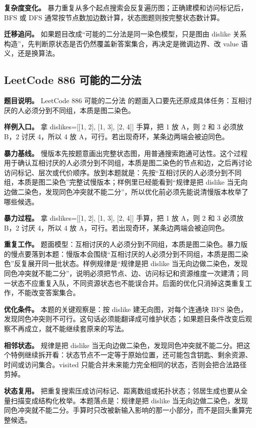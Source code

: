 \textbf{复杂度变化。} 暴力重复从多个起点搜索会反复遍历图；正确建模和访问标记后，BFS 或 DFS 通常按节点数加边数计算，状态图题则按完整状态数计算。

\textbf{迁移追问。} 如果题目改成“可能的二分法是同一染色模型，只是图由 dislike 关系构造”，先判断原状态是否仍然覆盖新答案集合，再决定是微调边界、改 value 语义，还是换算法。

\subsection{LeetCode 886 可能的二分法}

\textbf{题目说明。} LeetCode 886 可能的二分法 的题面入口要先还原成具体任务：互相讨厌的人必须分到不同组，本质是图二染色。

\textbf{样例入口。} 拿 dislikes=[[1, 2], [1, 3], [2, 4]] 手算，把 1 放 A，则 2 和 3 必须放 B，2 讨厌 4，所以 4 放 A，可行。若出现奇环，某条边两端会被迫同色。

\textbf{暴力基线。} 慢版本先按题意画出完整状态图，用普通搜索跑通可达性。这个过程用于确认互相讨厌的人必须分到不同组，本质是图二染色的节点和边，之后再讨论访问标记、层次或代价顺序。放到本题就是：先按“互相讨厌的人必须分到不同组，本质是图二染色”完整试慢版本；样例里已经能看到“规律是把 dislike 当无向边做二染色，发现同色冲突就不能二分”，所以优化前必须先能说清慢版本枚举了哪些候选。

\textbf{暴力过程。} 拿 dislikes=[[1, 2], [1, 3], [2, 4]] 手算，把 1 放 A，则 2 和 3 必须放 B，2 讨厌 4，所以 4 放 A，可行。若出现奇环，某条边两端会被迫同色。

\textbf{重复工作。} 题面模型：互相讨厌的人必须分到不同组，本质是图二染色。暴力版的慢点要落到本题：慢版本会围绕“互相讨厌的人必须分到不同组，本质是图二染色”反复展开同一批状态。样例规律是“规律是把 dislike 当无向边做二染色，发现同色冲突就不能二分”，说明必须把节点、边、访问标记和资源维度一次建清；同一状态不应重复入队，不同资源状态也不能误合并。后面的优化只消掉这类重复工作，不能改变答案集合。

\textbf{优化条件。} 本题的关键观察是：按 dislike 建无向图，对每个连通块 BFS 染色，发现同色冲突则不可行。这句话必须能翻译成可维护状态；如果题目条件改变后观察不再成立，就不能继续套原来的写法。

\textbf{相邻状态。} 规律是把 dislike 当无向边做二染色，发现同色冲突就不能二分。把这个特例继续拆开看：状态节点不一定等于原始位置，还可能包含钥匙、剩余资源、时间或访问集合。visited 只能合并未来能力完全相同的状态，否则会把合法路径剪掉。

\textbf{状态复用。} 把重复搜索压成访问标记、距离数组或拓扑状态；邻居生成也要从全量扫描变成结构化枚举。本题落点是：规律是把 dislike 当无向边做二染色，发现同色冲突就不能二分。手算时只改被新输入影响的那一小部分，而不是回头重算完整候选。

